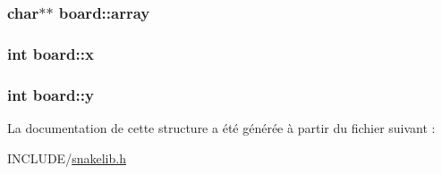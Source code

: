 \subsubsection[{\texorpdfstring{array}{array}}]{\setlength{\rightskip}{0pt plus 5cm}char$\ast$$\ast$ board\+::array}\hypertarget{structboard_a1d1e3a5155ec051a1e5a5e2d9de30e86}{}\label{structboard_a1d1e3a5155ec051a1e5a5e2d9de30e86}
\subsubsection[{\texorpdfstring{x}{x}}]{\setlength{\rightskip}{0pt plus 5cm}int board\+::x}\hypertarget{structboard_a45ad83890aed4b92ef175f0eb13cd1f3}{}\label{structboard_a45ad83890aed4b92ef175f0eb13cd1f3}
\subsubsection[{\texorpdfstring{y}{y}}]{\setlength{\rightskip}{0pt plus 5cm}int board\+::y}\hypertarget{structboard_a0a1685edc20c5b97527ccd4027d5f8eb}{}\label{structboard_a0a1685edc20c5b97527ccd4027d5f8eb}


La documentation de cette structure a été générée à partir du fichier suivant \+:\begin{DoxyCompactItemize}
\item 
I\+N\+C\+L\+U\+D\+E/\hyperlink{snakelib_8h}{snakelib.\+h}\end{DoxyCompactItemize}
